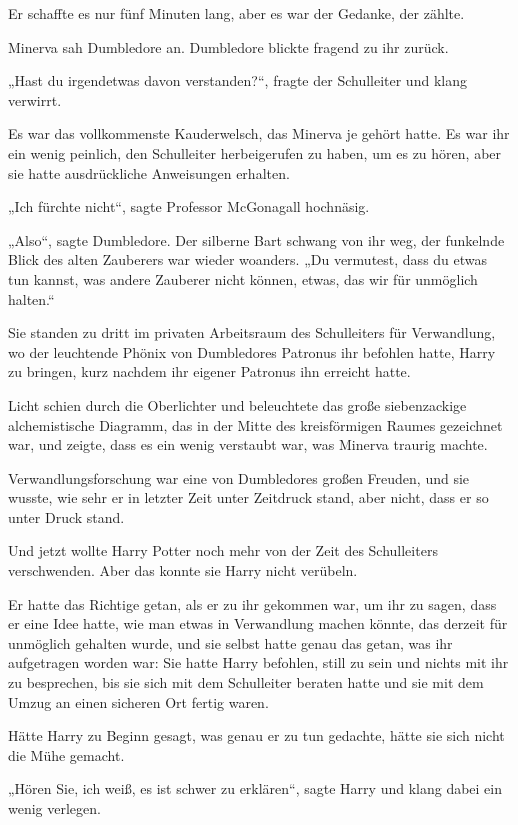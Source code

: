 {Er schaffte es nur fünf Minuten lang, aber es war der Gedanke, der zählte.

Minerva sah Dumbledore an. Dumbledore blickte fragend zu ihr zurück.

„Hast du irgendetwas davon verstanden?“, fragte der Schulleiter und klang verwirrt.

Es war das vollkommenste Kauderwelsch, das Minerva je gehört hatte. Es war ihr ein wenig peinlich, den Schulleiter herbeigerufen zu haben, um es zu hören, aber sie hatte ausdrückliche Anweisungen erhalten.

„Ich fürchte nicht“, sagte Professor McGonagall hochnäsig.

„Also“, sagte Dumbledore. Der silberne Bart schwang von ihr weg, der funkelnde Blick des alten Zauberers war wieder woanders. „Du vermutest, dass du etwas tun kannst, was andere Zauberer nicht können, etwas, das wir für unmöglich halten.“

Sie standen zu dritt im privaten Arbeitsraum des Schulleiters für Verwandlung, wo der leuchtende Phönix von Dumbledores Patronus ihr befohlen hatte, Harry zu bringen, kurz nachdem ihr eigener Patronus ihn erreicht hatte.

Licht schien durch die Oberlichter und beleuchtete das große siebenzackige alchemistische Diagramm, das in der Mitte des kreisförmigen Raumes gezeichnet war, und zeigte, dass es ein wenig verstaubt war, was Minerva traurig machte.

Verwandlungsforschung war eine von Dumbledores großen Freuden, und sie wusste, wie sehr er in letzter Zeit unter Zeitdruck stand, aber nicht, dass er so unter Druck stand.

Und jetzt wollte Harry Potter noch mehr von der Zeit des Schulleiters verschwenden. Aber das konnte sie Harry nicht verübeln.

Er hatte das Richtige getan, als er zu ihr gekommen war, um ihr zu sagen, dass er eine Idee hatte, wie man etwas in Verwandlung machen könnte, das derzeit für unmöglich gehalten wurde, und sie selbst hatte genau das getan, was ihr aufgetragen worden war: Sie hatte Harry befohlen, still zu sein und nichts mit ihr zu besprechen, bis sie sich mit dem Schulleiter beraten hatte und sie mit dem Umzug an einen sicheren Ort fertig waren.

Hätte Harry zu Beginn gesagt, was genau er zu tun gedachte, hätte sie sich nicht die Mühe gemacht.

„Hören Sie, ich weiß, es ist schwer zu erklären“, sagte Harry und klang dabei ein wenig verlegen.

}

